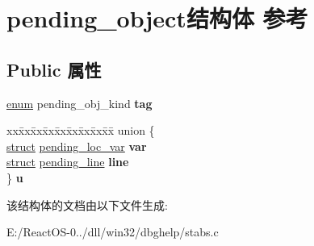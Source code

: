 \hypertarget{structpending__object}{}\section{pending\+\_\+object结构体 参考}
\label{structpending__object}
\subsection*{Public 属性}
\begin{DoxyCompactItemize}
\item 
\mbox{\label{structpending__object_abecfa140395c39f68eec89a24f1ce368}} 
\hyperlink{interfaceenum}{enum} pending\+\_\+obj\+\_\+kind {\bfseries tag}
\item 
\mbox{\label{structpending__object_a371dc3e2bd64c43104031a99a586568d}} 
\begin{tabbing}
xx\=xx\=xx\=xx\=xx\=xx\=xx\=xx\=xx\=\kill
union \{\\
\>\hyperlink{interfacestruct}{struct} \hyperlink{structpending__loc__var}{pending\_loc\_var} {\bfseries var}\\
\>\hyperlink{interfacestruct}{struct} \hyperlink{structpending__line}{pending\_line} {\bfseries line}\\
\} {\bfseries u}\\

\end{tabbing}\end{DoxyCompactItemize}


该结构体的文档由以下文件生成\+:\begin{DoxyCompactItemize}
\item 
E\+:/\+React\+O\+S-\/0../dll/win32/dbghelp/stabs.\+c\end{DoxyCompactItemize}
